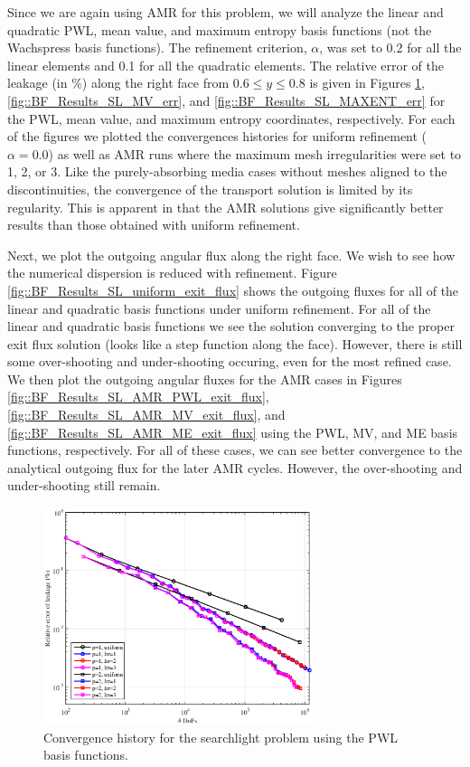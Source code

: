 Since we are again using AMR for this problem, we will analyze the linear and quadratic PWL, mean value, and maximum entropy basis functions (not the Wachspress basis functions). The refinement criterion, $\alpha$, was set to 0.2 for all the linear elements and 0.1 for all the quadratic elements. The relative error of the leakage (in \%) along the right face from $0.6 \leq y \leq 0.8$ is given in Figures \ref{fig::BF_Results_SL_PWL_err}, \ref{fig::BF_Results_SL_MV_err}, and \ref{fig::BF_Results_SL_MAXENT_err} for the PWL, mean value, and maximum entropy coordinates, respectively. For each of the figures we plotted the convergences histories for uniform refinement ($\alpha = 0.0$) as well as AMR runs where the maximum mesh irregularities were set to 1, 2, or 3. Like the purely-absorbing media cases without meshes aligned to the discontinuities, the convergence of the transport solution is limited by its regularity. This is apparent in that the AMR solutions give significantly better results than those obtained with uniform refinement. 

Next, we plot the outgoing angular flux along the right face. We wish to see how the numerical dispersion is reduced with refinement. Figure \ref{fig::BF_Results_SL_uniform_exit_flux} shows the outgoing fluxes for all of the linear and quadratic basis functions under uniform refinement. For all of the linear and quadratic basis functions we see the solution converging to the proper exit flux solution (looks like a step function along the face). However, there is still some over-shooting and under-shooting occuring, even for the most refined case. We then plot the outgoing angular fluxes for the AMR cases in Figures \ref{fig::BF_Results_SL_AMR_PWL_exit_flux}, \ref{fig::BF_Results_SL_AMR_MV_exit_flux}, and \ref{fig::BF_Results_SL_AMR_ME_exit_flux} using the PWL, MV, and ME basis functions, respectively. For all of these cases, we can see better convergence to the analytical outgoing flux for the later AMR cycles. However, the over-shooting and under-shooting still remain.

\begin{figure}
\centering
\includegraphics[width=0.70\textwidth]{figures/sec_BF/SL_PWL_Err.eps}
\caption{Convergence history for the searchlight problem using the PWL basis functions.}
\label{fig::BF_Results_SL_PWL_err}
\end{figure}

